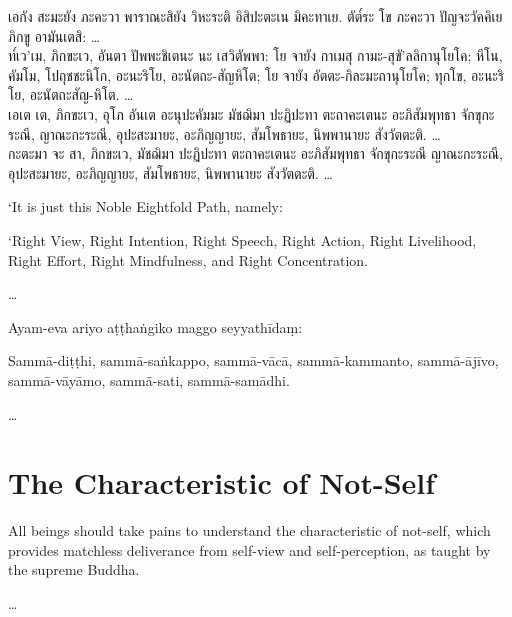 เอกัง สะมะยัง ภะคะวา พาราณะสิยัง วิหะระติ อิสิปะตะเน มิคะทาเย.
ตัต๎ระ โข ภะคะวา ปัญจะวัคคิเย ภิกขู อามันเตสิ:
\ldots{}\\
ท๎เว’เม, ภิกขะเว, อันตา ปัพพะชิเตนะ นะ เสวิตัพพา: โย จายัง กาเมสุ
กามะ-สุขั’ลลิกานุโยโค; หีโน, คัมโม, โปถุชชะนิโก, อะนะริโย, อะนัตถะ-สัญหิโต; โย จายัง อัตตะ-กิละมะถานุโยโค; ทุกโข, อะนะริโย, อะนัตถะสัญ-หิโต.
\ldots{}\\
เอเต เต, ภิกขะเว, อุโภ อันเต อะนุปะคัมมะ มัชฌิมา ปะฏิปะทา ตะถาคะเตนะ อะภิสัมพุทธา จักขุกะระณี, ญาณะกะระณี, อุปะสะมายะ, อะภิญญายะ, สัมโพธายะ, นิพพานายะ สังวัตตะติ.
\ldots{}\\
กะตะมา จะ สา, ภิกขะเว, มัชฌิมา ปะฏิปะทา ตะถาคะเตนะ อะภิสัมพุทธา จักขุกะระณี ญาณะกะระณี, อุปะสะมายะ, อะภิญญายะ, สัมโพธายะ, นิพพานายะ สังวัตตะติ.
\ldots{}\\
\clearpage

\englishText
\markboth{\englishTitle}{\rightmark}

‘It is just this Noble Eightfold Path, namely:

‘Right View, Right Intention, Right Speech, Right Action, Right
Livelihood, Right Effort, Right Mindfulness, and Right Concentration.

\ldots{}

\clearpage

\paliText
\markboth{\paliTitle}{\rightmark}

Ayam-eva ariyo aṭṭhaṅgiko maggo seyyathīdaṃ:

Sammā-diṭṭhi, sammā-saṅkappo, sammā-vācā, sammā-kammanto, sammā-ājīvo,
sammā-vāyāmo, sammā-sati, sammā-samādhi.

\ldots{}

\chapterTocDelegatePageNumber
\chapter{The Characteristic of Not-Self}

\setTocDelegatedPageNumber
\englishText
\renewcommand{\englishTitle}{The Characteristic of Not-Self}

\begin{leader}

All beings should take pains to understand the characteristic of
not-self, which provides matchless deliverance from self-view and
self-perception, as taught by the supreme Buddha.

\ldots{}

\end{leader}

